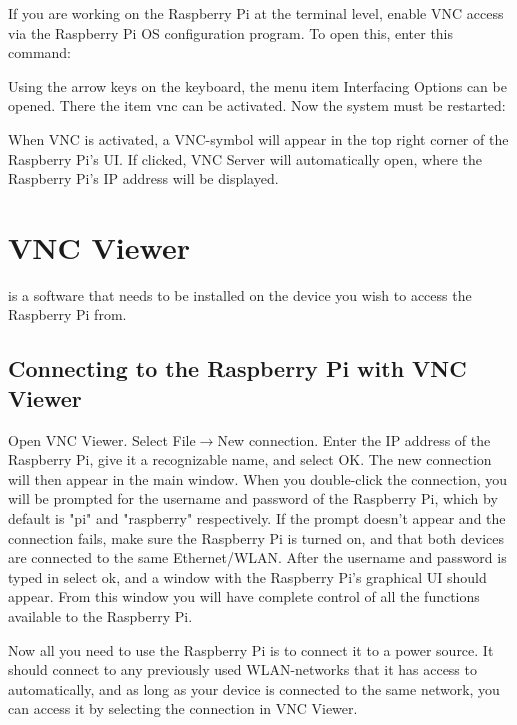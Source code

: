 If you are working on the Raspberry Pi at the terminal level, enable VNC access via the Raspberry Pi OS configuration program. To open this, enter this command:

\medskip


\medskip


Using the arrow keys on the keyboard, the menu item \glqq Interfacing Options\grqq{} can be opened. There
the item \glqq vnc\grqq{} can be activated. Now the system must be restarted:

\medskip


\bigskip

When VNC is activated, a VNC-symbol will appear in the top right corner of the Raspberry Pi's UI. If clicked, VNC Server will automatically open, where the Raspberry Pi's IP address will be displayed.



\section{VNC Viewer}

\href{https://www.realvnc.com/en/connect/download/viewer/}{\color{blue}{VNC Viewer}} is a software that needs to be installed on the device you wish to access the Raspberry Pi from. 

\subsection{Connecting to the Raspberry Pi with VNC Viewer}

Open VNC Viewer. Select File$\rightarrow$New connection. Enter the IP address of the Raspberry Pi, give it a recognizable name, and select OK. The new connection will then appear in the main window. When you double-click the connection, you will be prompted for the username and password of the Raspberry Pi, which by default is "pi" and "raspberry" respectively. If the prompt doesn't appear and the connection fails, make sure the Raspberry Pi is turned on, and that both devices are connected to the same Ethernet/WLAN. After the username and password is typed in select ok, and a window with the Raspberry Pi's graphical UI should appear. From this window you will have complete control of all the functions available to the Raspberry Pi. 

\medskip

Now all you need to use the Raspberry Pi is to connect it to a power source. It should connect to any previously used WLAN-networks that it has access to automatically, and as long as your device is connected to the same network, you can access it by selecting the connection in VNC Viewer.